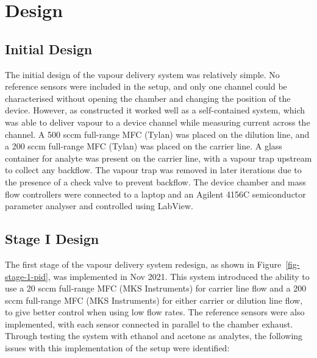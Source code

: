 \documentclass[
  a4paper,
]{scrbook}
\begin{document}
\hypertarget{sec-vapour-system-design}{%
\section{Design}\label{sec-vapour-system-design}}

\hypertarget{initial-design}{%
\subsection{Initial Design}\label{initial-design}}

The initial design of the vapour delivery system was relatively simple.
No reference sensors were included in the setup, and only one channel
could be characterised without opening the chamber and changing the
position of the device. However, as constructed it worked well as a
self-contained system, which was able to deliver vapour to a device
channel while measuring current across the channel. A 500 sccm
full-range MFC (Tylan) was placed on the dilution line, and a 200 sccm
full-range MFC (Tylan) was placed on the carrier line. A glass container
for analyte was present on the carrier line, with a vapour trap upstream
to collect any backflow. The vapour trap was removed in later iterations
due to the presence of a check valve to prevent backflow. The device
chamber and mass flow controllers were connected to a laptop and an
Agilent 4156C semiconductor parameter analyser and controlled using
LabView.

\hypertarget{sec-vapour-system-design-1}{%
\subsection{Stage I Design}\label{sec-vapour-system-design-1}}

The first stage of the vapour delivery system redesign, as shown in
Figure~\ref{fig-stage-1-pid}, was implemented in Nov 2021. This system
introduced the ability to use a 20 sccm full-range MFC (MKS Instruments)
for carrier line flow and a 200 sccm full-range MFC (MKS Instruments)
for either carrier or dilution line flow, to give better control when
using low flow rates. The reference sensors were also implemented, with
each sensor connected in parallel to the chamber exhaust. Through
testing the system with ethanol and acetone as analytes, the following
issues with this implementation of the setup were identified:
\end{document}
